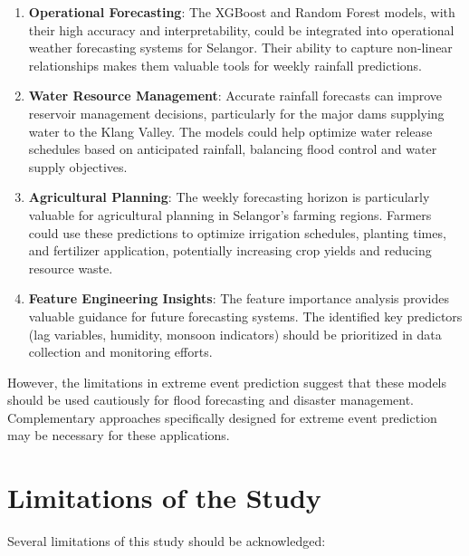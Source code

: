\documentclass[12pt]{article}
\begin{document}
\begin{enumerate}
    \item \textbf{Operational Forecasting}: The XGBoost and Random Forest models, with their high accuracy and interpretability, could be integrated into operational weather forecasting systems for Selangor. Their ability to capture non-linear relationships makes them valuable tools for weekly rainfall predictions.
    
    \item \textbf{Water Resource Management}: Accurate rainfall forecasts can improve reservoir management decisions, particularly for the major dams supplying water to the Klang Valley. The models could help optimize water release schedules based on anticipated rainfall, balancing flood control and water supply objectives.
    
    \item \textbf{Agricultural Planning}: The weekly forecasting horizon is particularly valuable for agricultural planning in Selangor's farming regions. Farmers could use these predictions to optimize irrigation schedules, planting times, and fertilizer application, potentially increasing crop yields and reducing resource waste.
    
    \item \textbf{Feature Engineering Insights}: The feature importance analysis provides valuable guidance for future forecasting systems. The identified key predictors (lag variables, humidity, monsoon indicators) should be prioritized in data collection and monitoring efforts.
\end{enumerate}

However, the limitations in extreme event prediction suggest that these models should be used cautiously for flood forecasting and disaster management. Complementary approaches specifically designed for extreme event prediction may be necessary for these applications.

\section{Limitations of the Study}
\label{sec:study_limitations}

Several limitations of this study should be acknowledged:
\end{document}
